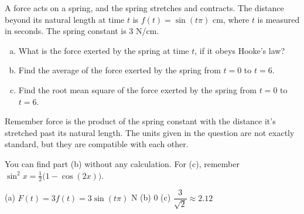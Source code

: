 \begin{question}\label{prob_s2.2:RMS3}
A force acts on a spring, and the spring stretches and contracts. The distance beyond its natural length at time $t$ is $f(t) = \sin\left(t\pi\right)$ cm, where $t$ is measured in seconds. The spring constant is 3 N/cm.
\begin{enumerate}[(a)]
\item What is the force exerted by the spring at time $t$, if it obeys Hooke's law?
\item Find the average of the force exerted by the spring from $t=0$ to $t=6$.
\item Find the root mean square of the force exerted by the spring from $t=0$ to $t=6$.
\end{enumerate}
\end{question}
\begin{hint}
Remember force is the product of the spring constant with the distance it's stretched past its natural length. The units given in the question are not exactly standard, but they are compatible with each other.

You can find part (b) without any calculation. For (c), remember $\sin^2 x = \frac{1}{2}\big(1-\cos(2x)\big)$.
\end{hint}
\begin{answer}
(a) $F(t) = 3f(t) = 3\sin\left(t\pi\right)$ N \qquad
(b) 0 \qquad (c) $\dfrac{3}{\sqrt{2}} \approx 2.12$
\end{answer}
